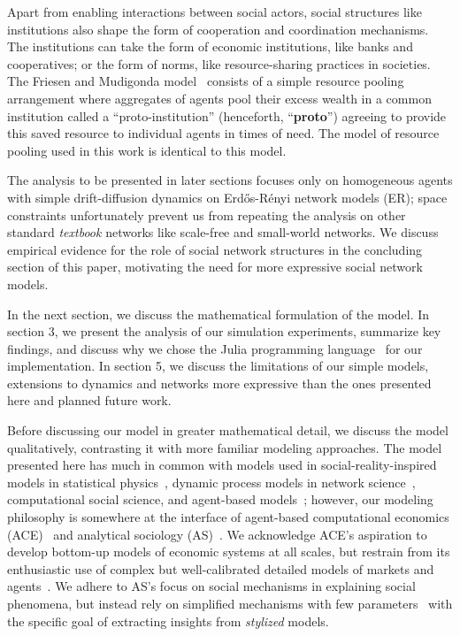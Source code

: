 Apart from enabling interactions between social actors, social structures like institutions also shape the form of cooperation and coordination mechanisms. The institutions can take the form of economic institutions, like banks and cooperatives; or the form of norms, like resource-sharing practices in societies. The Friesen and Mudigonda model~\cite{srimil} consists of a simple resource pooling arrangement where aggregates of agents pool their excess wealth in a common institution called a ``proto-institution'' (henceforth, ``\textbf{proto}'') agreeing to provide this saved resource to individual agents in times of need. The model of resource pooling used in this work is identical to this model. 

The analysis to be presented in later sections focuses only on homogeneous agents with simple drift-diffusion dynamics on Erd\H{o}s-R\'{e}nyi network models (ER); space constraints unfortunately prevent us from repeating the analysis on other standard \textit{textbook} networks like scale-free and small-world networks. We discuss empirical evidence for the role of social network structures in the concluding section of this paper, motivating the need for more expressive social network models. 


In the next section, we discuss the mathematical formulation of the model. In section 3, we present the analysis of our simulation experiments, summarize key findings, and discuss why we chose the Julia programming language~\cite{Julia-2017} for our implementation. In section 5, we discuss the limitations of our simple models, extensions to dynamics and networks more expressive than the ones presented here and planned future work. 

Before discussing our model in greater mathematical detail, we discuss the model qualitatively, contrasting it with more familiar modeling approaches. The model presented here has much in common with models used in social-reality-inspired models in statistical physics~\cite{redner2001guide}, dynamic process models in network science~\cite{newman2018networks}, computational social science, and agent-based models~\cite{abm_review}; however, our modeling philosophy is somewhere at the interface of agent-based computational economics (ACE)~\cite{tesfatsion} and analytical sociology (AS)~\cite{ch1as_hdbk,ch2as_hdbk}. We acknowledge ACE's aspiration to develop bottom-up models of economic systems at all scales, but restrain from its enthusiastic use of complex but well-calibrated detailed models of markets and agents~\cite{tesfatsion2017}. We adhere to AS's focus on social mechanisms in explaining social phenomena, but instead rely on simplified mechanisms with few parameters~\cite{ch11as_hdbk} with the specific goal of extracting insights from \textit{stylized} models.       

